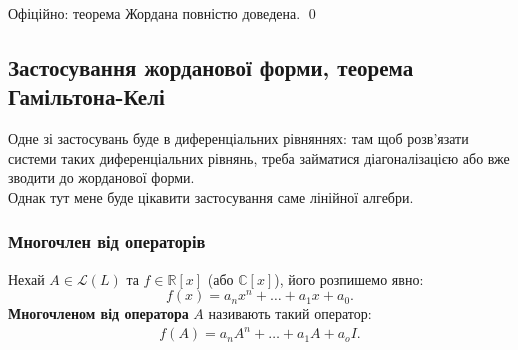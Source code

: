 \documentclass{math_library}
\begin{document}
Офіційно: теорема Жордана повністю доведена. \qed

\subsection{Застосування жорданової форми, теорема Гамільтона-Келі}
Одне зі застосувань буде в диференціальних рівняннях: там щоб розв'язати системи таких диференціальних рівнянь, треба займатися діагоналізацією або вже зводити до жорданової форми.\\
Однак тут мене буде цікавити застосування саме лінійної алгебри.

\subsubsection*{Многочлен від операторів}
\begin{definition}
Нехай $A \in \mathcal{L}(L)$ та $f \in \mathbb{R}[x]$ (або $\mathbb{C}[x]$), його розпишемо явно:
\[
f(x) = a_n x^n + \dots + a_1 x + a_0.
\]
\textbf{Многочленом від оператора} $A$ називають такий оператор:
\begin{align*}
f(A) = a_n A^n + \dots + a_1 A + a_o I.
\end{align*}
\end{definition}
\end{document}
